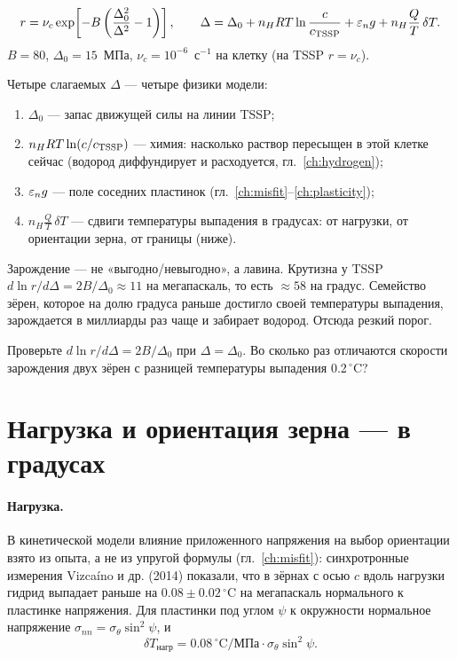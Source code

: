 \begin{keyf}
\[
r=\nu_c\exp\!\left[-B\left(\frac{\Delta_0^2}{\Delta^2}-1\right)\right],\qquad
\Delta=\Delta_0+n_HRT\ln\frac{c}{c_{\mathrm{TSSP}}}+\varepsilon_n g+n_H\frac{Q}{T}\,\delta T .
\]
$B=80$, $\Delta_0=15$~МПа, $\nu_c=10^{-6}$~с$^{-1}$ на клетку (на TSSP $r=\nu_c$).
\end{keyf}

Четыре слагаемых $\Delta$ --- четыре физики модели:
\begin{enumerate}
\item $\Delta_0$ --- запас движущей силы на линии TSSP;
\item $n_HRT\ln(c/c_{\mathrm{TSSP}})$ --- химия: насколько раствор пересыщен в этой клетке сейчас
  (водород диффундирует и расходуется, гл.~\ref{ch:hydrogen});
\item $\varepsilon_n g$ --- поле соседних пластинок (гл.~\ref{ch:misfit}--\ref{ch:plasticity});
\item $n_H\frac{Q}{T}\,\delta T$ --- сдвиги температуры выпадения в градусах: от нагрузки, от
  ориентации зерна, от границы (ниже).
\end{enumerate}


\begin{idea}
Зарождение --- не «выгодно/невыгодно», а лавина. Крутизна у TSSP $d\ln r/d\Delta=2B/\Delta_0\approx11$
на мегапаскаль, то есть $\approx58$ на градус. Семейство зёрен, которое на долю градуса раньше
достигло своей температуры выпадения, зарождается в миллиарды раз чаще и забирает водород.
Отсюда резкий порог.
\end{idea}

\begin{exercise}
Проверьте $d\ln r/d\Delta=2B/\Delta_0$ при $\Delta=\Delta_0$. Во сколько раз отличаются скорости
зарождения двух зёрен с разницей температуры выпадения 0.2\,$^\circ$C?
\end{exercise}

\section{Нагрузка и ориентация зерна --- в градусах}

\paragraph{Нагрузка.} В кинетической модели влияние приложенного напряжения на выбор ориентации
взято из опыта, а не из упругой формулы (гл.~\ref{ch:misfit}): синхротронные измерения Vizcaíno
и др. (2014) показали, что в зёрнах с осью $c$ вдоль нагрузки гидрид выпадает раньше на
$0.08\pm0.02\,^\circ$C на мегапаскаль нормального к пластинке напряжения. Для пластинки под углом
$\psi$ к окружности нормальное напряжение $\sigma_{nn}=\sigma_\theta\sin^2\psi$, и
\begin{equation}
\delta T_{\text{нагр}}=0.08\,^\circ\text{C/МПа}\cdot\sigma_\theta\sin^2\psi .
\end{equation}

